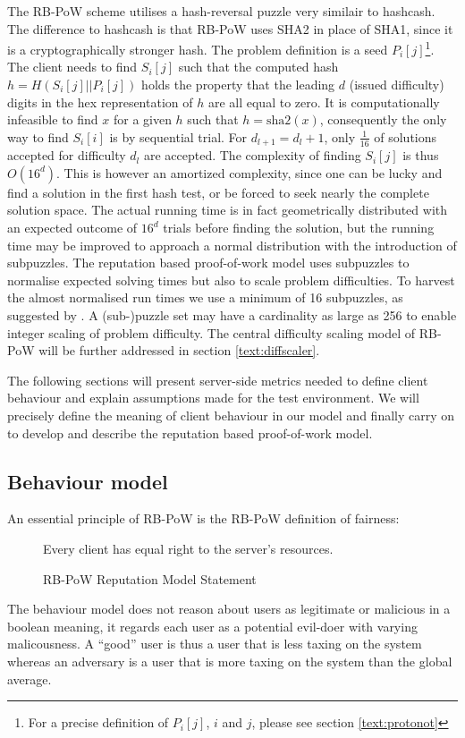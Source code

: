 The RB-PoW scheme utilises a hash-reversal puzzle very similair to hashcash. The difference to hashcash is that RB-PoW uses SHA2 in place of SHA1, since it is a cryptographically stronger hash.
The problem definition is a seed $P_i[j]$\footnote{For a precise definition of $P_i[j]$, $i$ and $j$, please see section \ref{text:protonot}}.
The client needs to find $S_i[j]$ such that the computed hash $ h = H(S_i[j]||P_i[j])$ holds the property that the leading $d$ (issued difficulty) digits in the hex representation of $h$ are all equal to zero. 
It is computationally infeasible to find $x$  for a given $h$ such that $ h = \mbox{sha2}(x)$\cite{sha2}, consequently the only way to find $S_i[i]$ is by sequential trial. For $d_{l+1} = d_l + 1 $, only $\frac{1}{16}$ of solutions accepted for difficulty $d_l$ are accepted.
The complexity of finding $S_i[j]$ is thus $O(16^d)$. This is however an amortized complexity, since one can be lucky and find a solution in the first hash test, or be forced to seek nearly the complete solution space.
The actual running time is in fact geometrically distributed with an expected outcome of $16^d$ trials before finding the solution, but the running time may be improved to approach a normal distribution with the introduction of subpuzzles\cite{subpuzzles}. 
The reputation based proof-of-work model uses subpuzzles to normalise expected solving times but also to scale problem difficulties. To harvest the almost normalised run times we use a minimum of 16 subpuzzles, as suggested by \citeauthor{subpuzzles}. A (sub-)puzzle set may have a cardinality as large as 256 to enable integer scaling of problem difficulty. The central difficulty scaling model of RB-PoW will be further addressed in section \ref{text:diffscaler}.



The following sections will present server-side metrics needed to define client behaviour and explain assumptions made for the test environment. 
We will precisely define the meaning of client behaviour in our model and finally carry on to develop and describe the reputation based proof-of-work model.



\subsection{Behaviour model}\label{tab:behaviourmodel}
An essential principle of RB-PoW is the RB-PoW definition of fairness:
\begin{figure}[H]
\begin{GrayBox}[0.65\textwidth]
Every client has equal right to the server's resources.
\end{GrayBox}
\caption{RB-PoW Reputation Model Statement}
\end{figure}
The behaviour model does not reason about users as legitimate or malicious in a boolean meaning, it regards each user as a potential evil-doer with varying malicousness. A ``good'' user is thus a user that is less taxing on the system whereas an adversary is a user that is more taxing on the system than the global average.  

